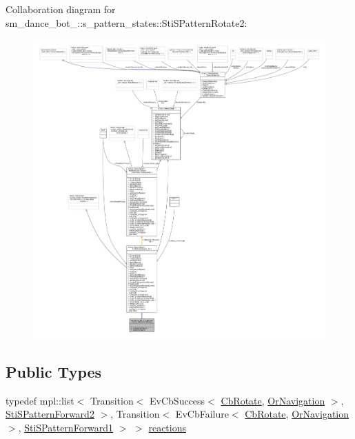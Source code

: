 Collaboration diagram for sm\+\_\+dance\+\_\+bot\+\_\+:\+:s\+\_\+pattern\+\_\+states\+:\+:Sti\+S\+Pattern\+Rotate2\+:
\nopagebreak
\begin{figure}[H]
\begin{center}
\leavevmode
\includegraphics[width=350pt]{structsm__dance__bot__2_1_1s__pattern__states_1_1StiSPatternRotate2__coll__graph}
\end{center}
\end{figure}
\subsection*{Public Types}
\begin{DoxyCompactItemize}
\item 
typedef mpl\+::list$<$ Transition$<$ Ev\+Cb\+Success$<$ \hyperlink{classcl__move__base__z_1_1CbRotate}{Cb\+Rotate}, \hyperlink{classsm__dance__bot__2_1_1OrNavigation}{Or\+Navigation} $>$, \hyperlink{structsm__dance__bot__2_1_1s__pattern__states_1_1StiSPatternForward2}{Sti\+S\+Pattern\+Forward2} $>$, Transition$<$ Ev\+Cb\+Failure$<$ \hyperlink{classcl__move__base__z_1_1CbRotate}{Cb\+Rotate}, \hyperlink{classsm__dance__bot__2_1_1OrNavigation}{Or\+Navigation} $>$, \hyperlink{structsm__dance__bot__2_1_1s__pattern__states_1_1StiSPatternForward1}{Sti\+S\+Pattern\+Forward1} $>$ $>$ \hyperlink{structsm__dance__bot__2_1_1s__pattern__states_1_1StiSPatternRotate2_a90493c711e97af34e0db4fbaa87ba3e8}{reactions}
\end{DoxyCompactItemize}
